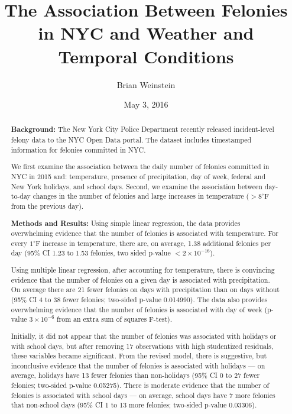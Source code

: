 \documentclass[11pt,notitlepage]{article}
\newcommand{\degf}{^\circ\text{F}}
\begin{document}
\title{The Association Between Felonies in NYC and Weather and Temporal Conditions}
\author{Brian Weinstein}
\date{May 3, 2016}

\maketitle



\begin{abstract}


\noindent \textbf{Background:} The New York City Police Department recently released incident-level felony data to the NYC Open Data portal. The dataset includes timestamped information for felonies committed in NYC.

We first examine the association between the daily number of felonies committed in NYC in 2015 and: temperature, presence of precipitation, day of week, federal and New York holidays, and school days. Second, we examine the association between day-to-day changes in the number of felonies and large increases in temperature ($>8 \degf$ from the previous day).

\noindent \textbf{Methods and Results:} Using simple linear regression, the data provides overwhelming evidence that the number of felonies is associated with temperature. For every $1 \degf$ increase in temperature, there are, on average, 1.38 additional felonies per day (95\% CI 1.23 to 1.53 felonies, two sided p-value $<2\times10^{-16}$).

Using multiple linear regression, after accounting for temperature, there is convincing evidence that the number of felonies on a given day is associated with precipitation. On average there are 21 fewer felonies on days with precipitation than on days without (95\% CI 4 to 38 fewer felonies; two-sided p-value 0.014990). The data also provides overwhelming evidence that the number of felonies is associated with day of week (p-value $3 \times 10^{-6}$ from an extra sum of squares F-test).

Initially, it did not appear that the number of felonies was associated with holidays or with school days, but after removing 17 observations with high studentized residuals, these variables became significant. From the revised model, there is suggestive, but inconclusive evidence that the number of felonies is associated with holidays --- on average, holidays have 13 fewer felonies than non-holidays (95\% CI 0 to 27 fewer felonies; two-sided p-value 0.05275). There is moderate evidence that the number of felonies is associated with school days --- on average, school days have 7 more felonies that non-school days (95\% CI 1 to 13 more felonies; two-sided p-value 0.03306).


\end{abstract}
\end{document}
